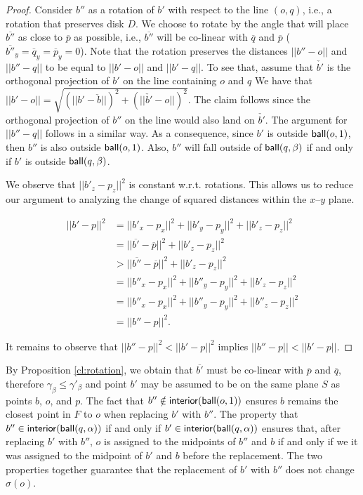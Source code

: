 \documentclass[11pt]{article}
\newcommand{\ball}{{\sf ball}}
\newcommand{\interior}{{\sf interior}}
\begin{document}
\begin{proof}
Consider $ b'' $ as a rotation of $ b' $ with respect to the line $(o,q)$, i.e., a rotation that preserves  disk $D$. We choose to rotate by the angle that will place $\overline{b''}$ as close to $\overline{p}$ as possible, i.e., $\overline{b''}$ will be co-linear with $\overline{q}$ and $\overline{p}$ ($\overline{b''}_y = \overline{q}_y = \overline{p}_y = 0$). Note that the rotation preserves the distances $||b'' - o||$ and $||b'' - q||$ to be equal to $||b' - o||$ and $||b' - q||$. To see that, assume that $\check{b'}$ is the orthogonal projection of $b'$ on the line containing $o$ and $q$ We have that $||b' - o|| = \sqrt{(||b' - \check{b}||)^2 + (||\check{b'} - o||)^2}$. The claim follows since the orthogonal projection of $b''$ on the line would also land on $\check{b'}$. The argument for $||b'' - q||$ follows in a similar way. As a consequence, since $b'$ is outside $\ball (o, 1)$, then $b''$ is also outside $\ball (o, 1)$. Also, $b''$ will fall outside of $\ball(q, \beta)$ if and only if $b'$ is outside $\ball(q, \beta)$.

We observe that $||b'_{z}-p_z||^2$  is constant w.r.t. rotations. This allows us to reduce our argument to analyzing the change of squared distances within the $x$--$y$ plane.

\begin{align*}
    ||b'-p||^2 & = ||b'_x-p_x||^2+ ||b'_{y}-p_y||^2 + ||b'_{z}-p_z||^2 \\
               & = ||\overline{b'} - \overline{p}||^2 + ||b'_{z}-p_z||^2 \\
               & > ||\overline{b''} - \overline{p}||^2 + ||b'_{z}-p_z||^2 \\
               & = ||b''_x-p_x||^2+ ||b''_{y}-p_y||^2 + ||b'_{z}-p_z||^2 \\
               & = ||b''_x-p_x||^2+ ||b''_{y}-p_y||^2 + ||b''_{z}-p_z||^2 \\
               & = ||b''-p||^2.
\end{align*}

It remains to observe that $||b''-p||^2 < ||b' - p||^2$ implies $||b''-p|| < ||b' - p||$.

\end{proof}

By Proposition \ref{cl:rotation}, we obtain that $\overline{b'}$ must be co-linear with $\overline{p}$ and $\overline{q}$, therefore $\gamma_\beta \leq \gamma'_\beta$ and point $b'$ may be assumed to be on the same plane $S$ as points $b$, $o$, and $p$. The fact that $b'' \notin \interior(\ball (o,1))$ ensures $b$ remains the closest point in $F$ to $o$ when replacing $b'$ with $b''$. The property that $b''\in \interior(\ball (q, \alpha))$ if and only if $b'\in\interior(\ball (q, \alpha))$ ensures that, after replacing $b'$ with $b''$, $o$ is assigned to the midpoints of $b''$ and $b$ if and only if we it was assigned to the midpoint of $b'$ and $b$ before the replacement. The two properties together guarantee that the replacement of $b'$ with $b''$ does not change $\sigma(o)$.
\end{document}
